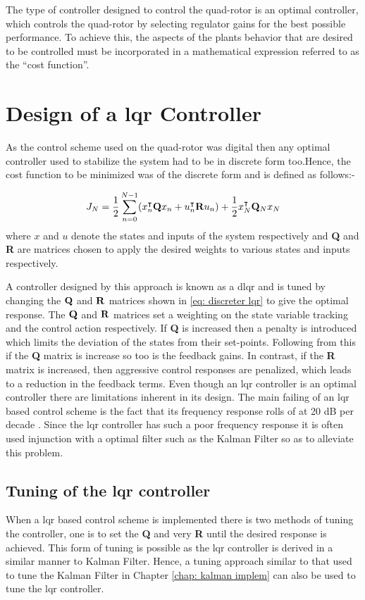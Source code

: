 The type of controller designed to control the quad-rotor is an optimal controller, which controls the quad-rotor by selecting regulator gains for the best possible performance. To achieve this, the aspects of the plants behavior that are desired to be controlled must be incorporated in a mathematical expression referred to as the \enquote{cost function}. 

\section{Design of a \gls{lqr} Controller}
As the control scheme used on the quad-rotor was digital then any optimal controller used to stabilize the system had to be in discrete form too.Hence, the cost function to be minimized was of the discrete form and is defined as follows:- 

 \begin{equation}
 J_N  = \frac{1}{2} \sum_{n=0}^{N-1}(x_n^\intercal {\bf Q} x_n + u_n^\intercal {\bf R }u_n) + \frac{1}{2}x_N^\intercal {\bf Q}_N x_N
 \label{eq: discreter lqr}
 \end{equation}
 where $x$ and $u$ denote the states and inputs of the system respectively and {\bf Q} and {\bf R} are matrices chosen to apply the desired weights to various states and inputs respectively. 
 
 A controller designed by this approach is known as a \gls{dlqr} and is tuned by changing the ${\bf Q}$ and ${\bf R}$ matrices shown in \eqref{eq: discreter lqr} to give the optimal response. The ${\bf Q}$ and ${\bf R}$ matrices set a weighting on the state variable tracking and the control action respectively. If {\bf Q} is increased then a penalty is introduced which limits the deviation of the states from their set-points. Following from this if the {\bf Q} matrix is increase so too is the feedback gains. In contrast, if the {\bf R} matrix is increased, then aggressive control responses are penalized, which leads to a reduction in the feedback terms. Even though an \gls{lqr} controller is an optimal controller there are limitations inherent in its design. The main failing of an \gls{lqr} based control scheme is the fact that its frequency response rolls of at 20 dB per decade \cite[pg 584-617]{Artofcontrol}. Since the \gls{lqr} controller has such a poor frequency response it is often used injunction with a optimal filter such as the Kalman Filter so as to alleviate this problem.
 
 \subsection{Tuning of the {\gls{lqr}} controller}
 When a \gls{lqr} based control scheme is implemented there is two methods of tuning the controller, one is to set the {\bf Q} and very {\bf R} until the desired response is achieved. This form of tuning is possible as the \gls{lqr} controller is derived in a similar manner to Kalman Filter. Hence, a tuning approach similar to that used to tune the Kalman Filter in Chapter \ref{chap: kalman implem} can also be used to tune the \gls{lqr} controller. 
 
